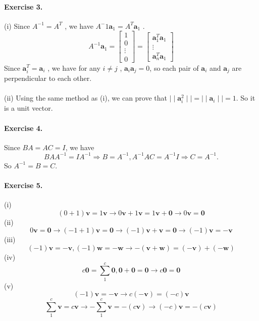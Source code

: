 \documentclass{article}
\begin{document}
\paragraph{Exercise 3.}
    (i) Since $ A^{-1}=A^T$ , we have $A^-1\mathbf{a}_1=A^T\mathbf{a}_1$ .\\
    \[
            A^{-1}\mathbf{a}_1= \begin{bmatrix}
                1 \\
                0 \\
                \vdots \\
                0
            \end{bmatrix} = \begin{bmatrix}
                \mathbf{a}_1^T \mathbf{a}_1 \\
                \vdots \\
                \mathbf{a}_n^T \mathbf{a}_1
                \end{bmatrix} 
 
    \]
    Since $ \mathbf{a}_i^T=\mathbf{a}_i $ , we have for any $i \neq j $ , $ \mathbf{a}_i \mathbf{a}_j = 0 $, 
    so each pair of  $\mathbf{a}_i$ and $\mathbf{a}_j$ are perpendicular to each other.\\\\
    (ii) Using the same method as (i), we can prove that $ \mid\mid\mathbf{a}_i^2\mid\mid =\mid\mid\mathbf{a}_i\mid\mid = 1$. So it is a unit vector.\\

\paragraph{Exercise 4.}
    Since $BA=AC=I$, we have 
    \[
        BAA^{-1}=IA^{-1} \Rightarrow B=A^{-1} , A^{-1}AC=A^{-1}I \Rightarrow C=A^{-1} .
    \]
    So $A^{-1}=B=C$.\\

\paragraph{Exercise 5.}
    (i) \[
     (0+1)\mathbf{v}=1\mathbf{v} \rightarrow  0\mathbf{v}+1\mathbf{v}=1\mathbf{v} + \mathbf{0} \rightarrow 0\mathbf{v}= \mathbf{0}
    \]
    (ii) \[
    0\mathbf{v}=\mathbf{0} \rightarrow (-1+1)\mathbf{v} = \mathbf{0} \rightarrow (-1)\mathbf{v} + \mathbf{v} = \mathbf{0} \rightarrow (-1)\mathbf{v} = -\mathbf{v}
    \]
    (iii) \[
    (-1)\mathbf{v}=-\mathbf{v},(-1)\mathbf{w}=-\mathbf{w} \rightarrow - (\mathbf{v}+\mathbf{w})=(-\mathbf{v})+(-\mathbf{w} )
    \]
    (iv) \[
    c\mathbf{0}=\sum_{1}^{c}\mathbf{0}, \mathbf{0}+\mathbf{0}=\mathbf{0} \rightarrow c\mathbf{0}=\mathbf{0}
    \]
    (v)\[
    (-1)\mathbf{v}=-\mathbf{v} \rightarrow c(-\mathbf{v})=(-c)\mathbf{v} 
    \]
    \[
        \sum_{1}^{c}\mathbf{v}=c\mathbf{v}\rightarrow -\sum_{1}^{c}\mathbf{v}=-(c\mathbf{v}) \rightarrow (-c)\mathbf{v}=-(c\mathbf{v})
    \]
\end{document}
